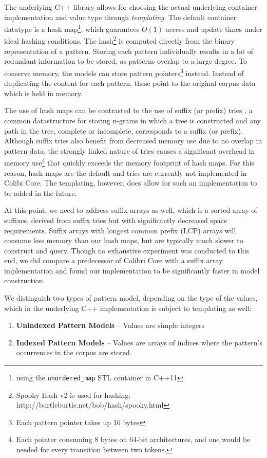 \documentclass[a4paper,12pt]{article}
\begin{document}
The underlying C++ library allows for choosing the actual underlying container
implementation and value type through \emph{templating}. The default container
datatype is a hash map\footnote{using the \texttt{unordered\_map} STL container
in C++11}, which guarantees $O(1)$ access and update times under ideal hashing
conditions. The hash\footnote{Spooky Hash v2 is used for hashing:
http://burtleburtle.net/bob/hash/spooky.html} is computed directly from the
binary representation of a pattern. Storing each pattern individually results
in a lot of redundant information to be stored, as patterns overlap to a large
degree. To conserve memory, the models can store pattern pointers\footnote{Each
pattern pointer takes up 16 bytes} instead. Instead of duplicating the content
for each pattern, these point to the original corpus data which is held in
memory.

The use of hash maps can be contrasted to the use of suffix (or prefix) tries
\cite{Weiner73}, a common datastructure for storing n-grams in which a tree is
constructed and any path in the tree, complete or incomplete, corresponds to a
suffix (or prefix).  Although suffix tries also benefit from decreased memory
use due to no overlap in pattern data, the strongly linked nature of tries
causes a significant overhead in memory use\footnote{Each pointer consuming 8
    bytes on 64-bit architectures, and one would be needed for every transition
between two tokens.} that quickly exceeds the memory footprint of hash maps.
For this reason, hash maps are the default and tries are currently not
implemented in Colibi Core. The templating, however, does allow for such an
implementation to be added in the future.

At this point, we need to address suffix arrays \cite{Manber90} as well, which
is a sorted array of suffixes, derived from suffix tries but with significantly
decreased space requirements. Suffix arrays with longest common prefix (LCP)
arrays will consume less memory than our hash maps, but are typically much
slower to construct and query. Though no exhaustive experiment was conducted to
this end, we did compare a predecessor of Colibri Core with a suffix array
implementation \cite{Stehouwer10} and found our implementation to be
significantly faster in model construction.

We distinguish two types of pattern model, depending on the type of the values,
which in the underlying C++ implementation is subject to templating as well:

\begin{enumerate}
 \item \textbf{Unindexed Pattern Models} -- Values are simple integers
 \item \textbf{Indexed Pattern Models} -- Values are arrays of indices where
     the pattern's occurrences in the corpus are stored.
\end{enumerate}
\end{document}
